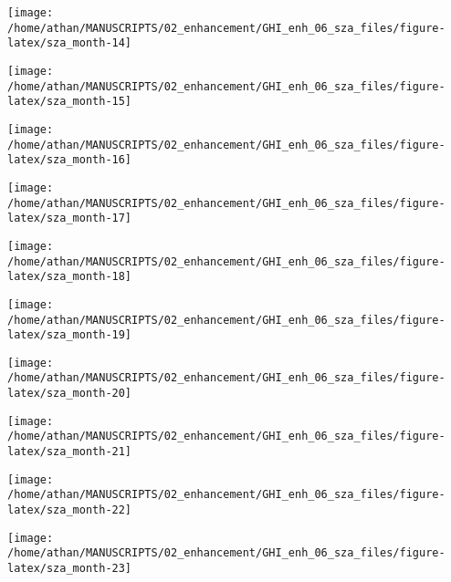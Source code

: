 \documentclass[
  10pt,
  a4paper,oneside]{article}
\begin{document}
\begin{center}\texttt{[image: /home/athan/MANUSCRIPTS/02\_enhancement/GHI\_enh\_06\_sza\_files/figure-latex/sza\_month-14]} \end{center}

\begin{center}\texttt{[image: /home/athan/MANUSCRIPTS/02\_enhancement/GHI\_enh\_06\_sza\_files/figure-latex/sza\_month-15]} \end{center}

\begin{center}\texttt{[image: /home/athan/MANUSCRIPTS/02\_enhancement/GHI\_enh\_06\_sza\_files/figure-latex/sza\_month-16]} \end{center}

\begin{center}\texttt{[image: /home/athan/MANUSCRIPTS/02\_enhancement/GHI\_enh\_06\_sza\_files/figure-latex/sza\_month-17]} \end{center}

\begin{center}\texttt{[image: /home/athan/MANUSCRIPTS/02\_enhancement/GHI\_enh\_06\_sza\_files/figure-latex/sza\_month-18]} \end{center}

\begin{center}\texttt{[image: /home/athan/MANUSCRIPTS/02\_enhancement/GHI\_enh\_06\_sza\_files/figure-latex/sza\_month-19]} \end{center}

\begin{center}\texttt{[image: /home/athan/MANUSCRIPTS/02\_enhancement/GHI\_enh\_06\_sza\_files/figure-latex/sza\_month-20]} \end{center}

\begin{center}\texttt{[image: /home/athan/MANUSCRIPTS/02\_enhancement/GHI\_enh\_06\_sza\_files/figure-latex/sza\_month-21]} \end{center}

\begin{center}\texttt{[image: /home/athan/MANUSCRIPTS/02\_enhancement/GHI\_enh\_06\_sza\_files/figure-latex/sza\_month-22]} \end{center}

\begin{center}\texttt{[image: /home/athan/MANUSCRIPTS/02\_enhancement/GHI\_enh\_06\_sza\_files/figure-latex/sza\_month-23]} \end{center}
\end{document}
